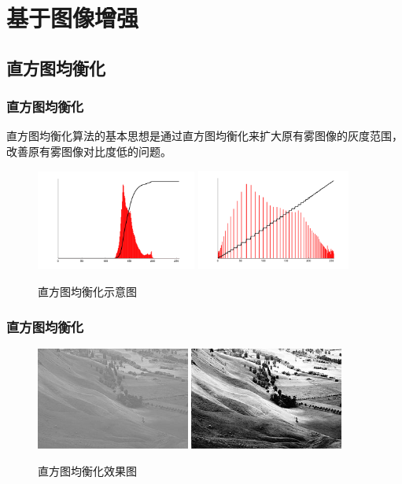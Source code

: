 
    \section{基于图像增强}

    \subsection{直方图均衡化}
    \begin{frame}
      \frametitle{直方图均衡化}
      直方图均衡化算法的基本思想是通过直方图均衡化来扩大原有雾图像的灰度范围，改善原有雾图像对比度低的问题。
      \begin{figure}
        \centering
        \includegraphics[width=0.47\textwidth]{figures/pic2.png}
        \includegraphics[width=0.45\textwidth]{figures/pic3.png}
        \caption{直方图均衡化示意图}
      \end{figure}
    \end{frame}
    \begin{frame}
      \frametitle{直方图均衡化}
      \begin{figure}
        \centering
        \includegraphics[width=0.45\textwidth]{figures/pic4.jpg}
        \includegraphics[width=0.45\textwidth]{figures/pic5.jpg}
        \caption{直方图均衡化效果图}
      \end{figure}
    \end{frame}


